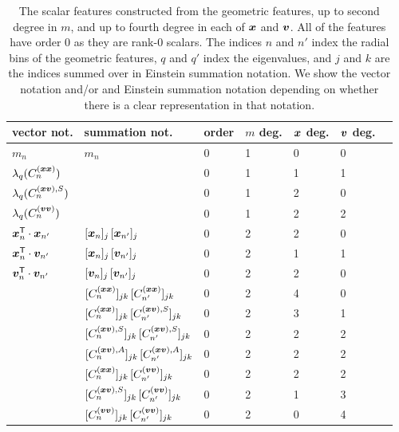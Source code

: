 \begin{table}
    \caption{The scalar features constructed from the geometric features, up to second degree in $m$, and up to fourth degree in each of $\bm{x}$ and $\bm{v}$. All of the features have order 0 as they are rank-0 scalars. The indices $n$ and $n'$ index the radial bins of the geometric features, $q$ and $q'$ index the eigenvalues, and $j$ and $k$ are the indices summed over in Einstein summation notation. We show the vector notation and/or and Einstein summation notation depending on whether there is a clear representation in that notation.} 
    \label{tab:scalars}
    \vspace{0.5em}
    \centering
    \begin{tabular}{|l|l|l|l|l|l|l|}
    \hline
    vector not. & summation not. & order & $m$ deg. & $\bm{x}$ deg. & $\bm{v}$ deg. \\
    \hline
    $m_n$ & $m_n$ & 0 & 1 & 0 & 0 \\
    $\lambda_q(C^{(\bm{x}\bm{x})}_n)$ & & 0 & 1 & 1 & 1 \\
    $\lambda_q(C^{(\bm{x}\bm{v}),S}_n)$ & & 0 & 1 & 2 & 0 \\
    $\lambda_q(C^{(\bm{v}\bm{v})}_n)$ & & 0 & 1 & 2 & 2 \\
    $\bm{x}_n^{\mathsf{T}} \cdot \bm{x}_{n'}$ & $[\bm{x}_{n}]_j \, [\bm{x}_{n'}]_j$ & 0 & 2 & 2 & 0 \\
    $\bm{x}_n^{\mathsf{T}} \cdot \bm{v}_{n'}$ & $[\bm{x}_{n}]_j \, [\bm{v}_{n'}]_j$ & 0 & 2 & 1 & 1 \\
    $\bm{v}_n^{\mathsf{T}} \cdot \bm{v}_{n'}$ & $[\bm{v}_{n}]_j \, [\bm{v}_{n'}]_j$ & 0 & 2 & 2 & 0 \\
     & $[C^{(\bm{x}\bm{x})}_n]_{jk} \, [C^{(\bm{x}\bm{x})}_{n'}]_{jk}$ & 0 & 2 & 4 & 0 \\
     & $[C^{(\bm{x}\bm{x})}_n]_{jk} \, [C^{(\bm{x}\bm{v}),S}_{n'}]_{jk}$ & 0 & 2 & 3 & 1 \\
     & $[C^{(\bm{x}\bm{v}),S}_{n}]_{jk} \, [C^{(\bm{x}\bm{v}),S}_{n'}]_{jk}$ & 0 & 2 & 2 & 2 \\
     & $[C^{(\bm{x}\bm{v}),A}_{n}]_{jk} \, [C^{(\bm{x}\bm{v}),A}_{n'}]_{jk}$ & 0 & 2 & 2 & 2 \\
     & $[C^{(\bm{x}\bm{x})}_{n}]_{jk} \, [C^{(\bm{v}\bm{v})}_{n'}]_{jk}$ & 0 & 2 & 2 & 2 \\
     & $[C^{(\bm{x}\bm{v}),S}_{n}]_{jk} \, [C^{(\bm{v}\bm{v})}_{n'}]_{jk}$ & 0 & 2 & 1 & 3 \\
     & $[C^{(\bm{v}\bm{v})}_{n}]_{jk} \, [C^{(\bm{v}\bm{v})}_{n'}]_{jk}$ & 0 & 2 & 0 & 4 \\
    \hline
    \end{tabular}
\end{table}

